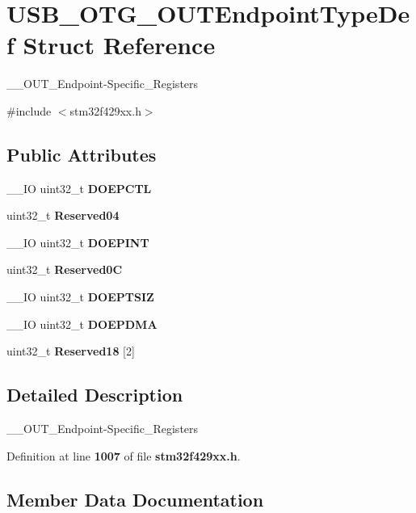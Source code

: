 \section{U\+S\+B\+\_\+\+O\+T\+G\+\_\+\+O\+U\+T\+Endpoint\+Type\+Def Struct Reference}
\label{structUSB__OTG__OUTEndpointTypeDef}


\+\_\+\+\_\+\+O\+U\+T\+\_\+\+Endpoint-\/\+Specific\+\_\+\+Registers  




{\ttfamily \#include $<$stm32f429xx.\+h$>$}

\subsection*{Public Attributes}
\begin{DoxyCompactItemize}
\item 
\+\_\+\+\_\+\+IO uint32\+\_\+t \textbf{ D\+O\+E\+P\+C\+TL}
\item 
uint32\+\_\+t \textbf{ Reserved04}
\item 
\+\_\+\+\_\+\+IO uint32\+\_\+t \textbf{ D\+O\+E\+P\+I\+NT}
\item 
uint32\+\_\+t \textbf{ Reserved0C}
\item 
\+\_\+\+\_\+\+IO uint32\+\_\+t \textbf{ D\+O\+E\+P\+T\+S\+IZ}
\item 
\+\_\+\+\_\+\+IO uint32\+\_\+t \textbf{ D\+O\+E\+P\+D\+MA}
\item 
uint32\+\_\+t \textbf{ Reserved18} [2]
\end{DoxyCompactItemize}


\subsection{Detailed Description}
\+\_\+\+\_\+\+O\+U\+T\+\_\+\+Endpoint-\/\+Specific\+\_\+\+Registers 

Definition at line \textbf{ 1007} of file \textbf{ stm32f429xx.\+h}.



\subsection{Member Data Documentation}
\mbox{\label{structUSB__OTG__OUTEndpointTypeDef_a905a2b4ece4882eb67c710e0db10e960}} 
